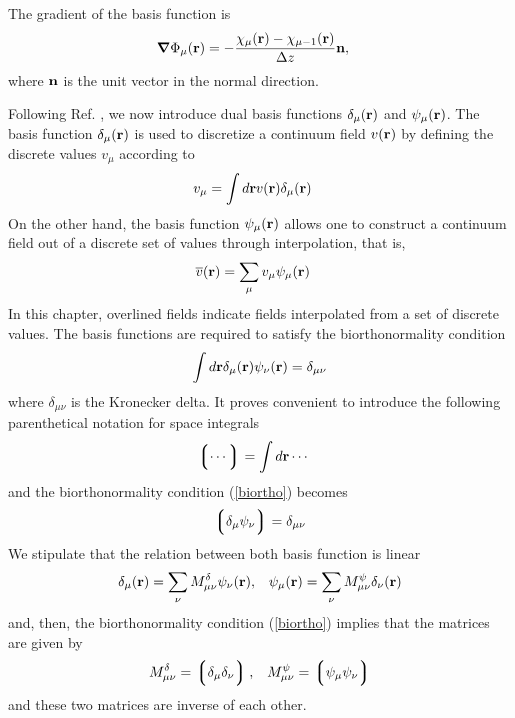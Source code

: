 \documentclass[b5paper,openright,10pt]{book}
\newcommand{\llg}{\left\lgroup}
\newcommand{\rlg}{\right\rgroup}
\begin{document}
The gradient of the basis function is
\begin{align}
\boldsymbol{\nabla}\Phi_\mu({\bf r})&=-\frac{\chi_\mu({\bf r})-\chi_{\mu-1}({\bf r})}{\Delta z}{\bf n},
\label{partialpsi}
\end{align}
where ${\bf n}$ is the unit vector in the normal direction.

Following  Ref. \cite{EspanolDonev2015},  we  now introduce  dual basis  functions
$\delta_\mu({\bf  r})$ and  $\psi_\mu({\bf r})$.   The basis  function
$\delta_\mu({\bf r})$ is used to  discretize a continuum field $v({\bf
  r})$ by defining the discrete values $v_\mu$ according to
\begin{align}
  v_\mu&=\int d{\bf r}v({\bf r})\delta_\mu({\bf r})
\label{Disc}
\end{align}
On the other hand,  the  basis function  $\psi_\mu({\bf r})$ allows one
to construct a continuum field out of a discrete set of values through
interpolation, that is,
\begin{align}
    \overline{v}({\bf r}) &=\sum_{\mu}v_\mu\psi_\mu({\bf r})
\label{Cont}
\end{align}
In this chapter, overlined fields indicate  fields interpolated from
a set of discrete values. 
The basis functions are required to
satisfy the biorthonormality condition
\begin{align}
  \int d{\bf r}\delta_\mu({\bf r})\psi_\nu({\bf r})=\delta_{\mu\nu}
\label{biortho}
\end{align}
where $\delta_{\mu\nu}$ is the Kronecker delta. 
It proves convenient to introduce the following 
parenthetical notation for space integrals
\begin{align}
  \llg \cdots\rlg &=\int d{\bf r}\cdots
\label{notation}
\end{align}
and the biorthonormality condition (\ref{biortho}) becomes
\begin{align}
\llg\delta_\mu\psi_\nu\rlg=\delta_{\mu\nu}
\label{biortho2}
\end{align}
We stipulate that the relation between both basis function is linear
\begin{align}
    \delta_\mu({\bf r})=\sum_\nu M^\delta_{\mu\nu}\psi_\nu({\bf r}),&&
  \psi_\mu({\bf r})=\sum_\nu M^\psi_{\mu\nu}\delta_\nu({\bf r})
\label{dual}
\end{align}
and, then, the biorthonormality condition (\ref{biortho}) implies that 
the matrices are given by
\begin{align}
    M^\delta_{\mu\nu}= \llg\delta_\mu\delta_\nu\rlg, &&
  M^\psi_{\mu\nu}= \llg\psi_\mu\psi_\nu\rlg
\label{MM}
\end{align}
and these two matrices are inverse of each other.
\end{document}
